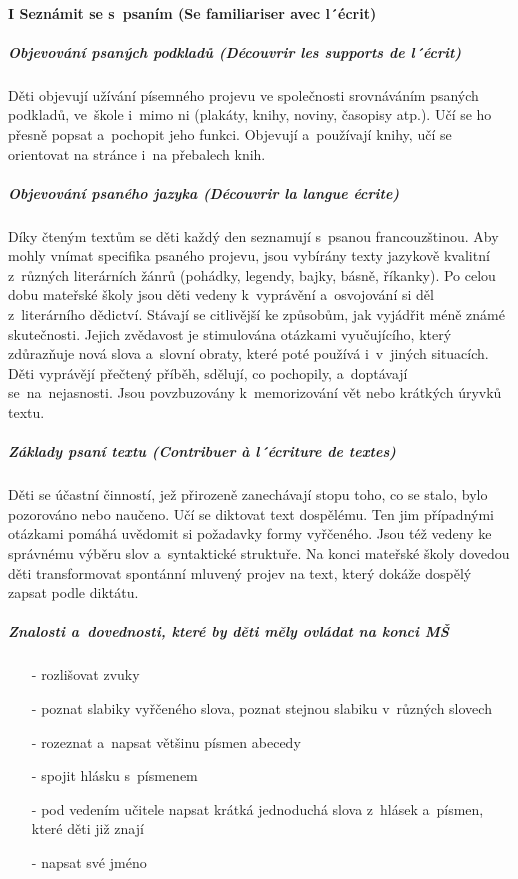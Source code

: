 			\paragraph*{I Seznámit se s psaním (Se familiariser avec l´écrit)}
				\subparagraph{Objevování psaných podkladů (Découvrir les supports de l´écrit)}
					Děti objevují užívání písemného projevu ve společnosti srovnáváním psaných podkladů, ve škole i~mimo ni (plakáty, knihy, noviny, časopisy atp.). Učí se ho přesně popsat a pochopit jeho funkci. Objevují a~používají knihy, učí se orientovat na stránce i~na přebalech knih. 
				\subparagraph{Objevování psaného jazyka (Découvrir la langue écrite)}
					Díky čteným textům se děti každý den seznamují s psanou francouzštinou. Aby mohly vnímat specifika psaného projevu, jsou vybírány texty jazykově kvalitní z různých literárních žánrů (pohádky, legendy, bajky, básně, říkanky). Po celou dobu mateřské školy jsou děti vedeny k vyprávění a~osvojování si děl z literárního dědictví. Stávají se citlivější ke způsobům, jak vyjádřit méně známé skutečnosti. Jejich zvědavost je stimulována otázkami vyučujícího, který zdůrazňuje nová slova a~slovní obraty, které poté používá i v jiných situacích.  Děti vyprávějí přečtený příběh, sdělují, co pochopily, a~doptávají se na nejasnosti. Jsou povzbuzovány k memorizování vět nebo krátkých úryvků textu. 
				\subparagraph{Základy psaní textu (Contribuer à l´écriture de textes)}
					Děti se účastní činností, jež přirozeně zanechávají stopu toho, co se stalo, bylo pozorováno nebo naučeno. Učí se diktovat text dospělému. Ten jim případnými otázkami pomáhá uvědomit si požadavky formy vyřčeného. Jsou též vedeny ke správnému výběru slov a syntaktické struktuře. Na konci mateřské školy dovedou děti transformovat spontánní mluvený projev na text, který dokáže dospělý zapsat podle diktátu.

				\subparagraph{Znalosti a~dovednosti, které by děti měly ovládat na konci MŠ} 
				\begin{itemize}
					\setlength\itemsep{-2mm}
					\item[-] rozlišovat zvuky
					\item[-] poznat slabiky vyřčeného slova, poznat stejnou slabiku v různých slovech
					\item[-] rozeznat a~napsat většinu písmen abecedy
					\item[-] spojit hlásku s písmenem
					\item[-] pod vedením učitele napsat krátká jednoduchá slova z hlásek a~písmen, které děti již znají 	
					\item[-] napsat své jméno
				\end{itemize}


